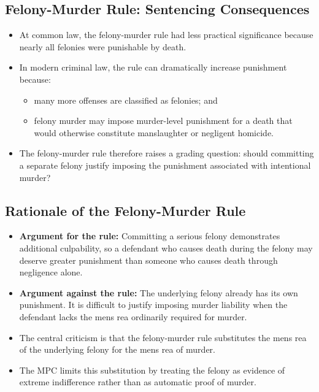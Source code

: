 \documentclass[11pt]{tex/lawoutline}
\begin{document}
\subsection{Felony-Murder Rule: Sentencing Consequences}
\begin{itemize}
    \item At common law, the felony-murder rule had less practical significance because nearly all felonies were punishable by death.
    \item In modern criminal law, the rule can dramatically increase punishment because:
    \begin{itemize}
        \item many more offenses are classified as felonies; and
        \item felony murder may impose murder-level punishment for a death that would otherwise constitute manslaughter or negligent homicide.
    \end{itemize}
    \item The felony-murder rule therefore raises a grading question: should committing a separate felony justify imposing the punishment associated with intentional murder?
\end{itemize}

\subsection{Rationale of the Felony-Murder Rule}
\begin{itemize}
    \item \textbf{Argument for the rule:} Committing a serious felony demonstrates additional culpability, so a defendant who causes death during the felony may deserve greater punishment than someone who causes death through negligence alone.
    \item \textbf{Argument against the rule:} The underlying felony already has its own punishment. It is difficult to justify imposing murder liability when the defendant lacks the mens rea ordinarily required for murder.
    \item The central criticism is that the felony-murder rule substitutes the mens rea of the underlying felony for the mens rea of murder.
    \item The MPC limits this substitution by treating the felony as evidence of extreme indifference rather than as automatic proof of murder.
\end{itemize}
\end{document}
